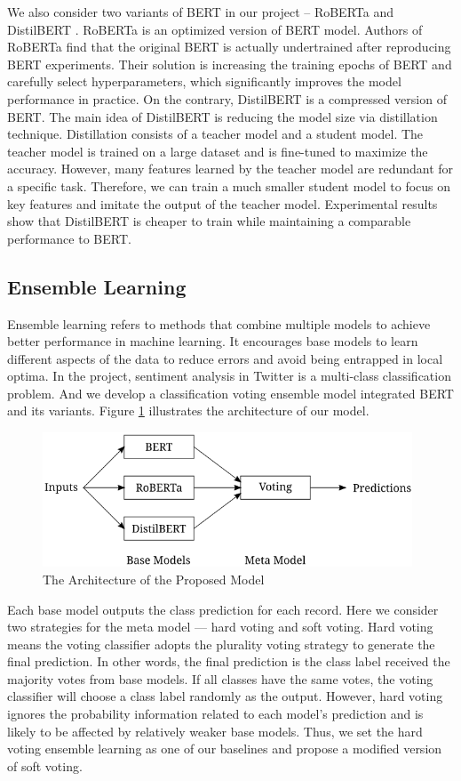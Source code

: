 \documentclass[runningheads]{llncs}
\begin{document}
We also consider two variants of BERT in our project -- RoBERTa \cite{roberta} and DistilBERT \cite{distilbert}. RoBERTa is an optimized version of BERT model. Authors of RoBERTa find that the original BERT is actually undertrained after reproducing BERT experiments. Their solution is increasing the training epochs of BERT and carefully select hyperparameters, which significantly improves the model performance in practice. On the contrary, DistilBERT is a compressed version of BERT. The main idea of DistilBERT is reducing the model size via distillation technique. Distillation consists of a teacher model and a student model. The teacher model is trained on a large dataset and is fine-tuned to maximize the accuracy. However, many features learned by the teacher model are redundant for a specific task. Therefore, we can train a much smaller student model to focus on key features and imitate the output of the teacher model. Experimental results show that DistilBERT is cheaper to train while maintaining a comparable performance to BERT.

\subsection{Ensemble Learning}
Ensemble learning refers to methods that combine multiple models to achieve better performance in machine learning. It encourages base models to learn different aspects of the data to reduce errors and avoid being entrapped in local optima. In the project, sentiment analysis in Twitter is a multi-class classification problem. And we develop a classification voting ensemble model integrated BERT and its variants. Figure \ref{fig:model} illustrates the architecture of our model.

\begin{figure}[!ht]
    \centering
    \includegraphics[width=11cm]{./figs/model.png}
    \caption{The Architecture of the Proposed Model}
    \label{fig:model}
\end{figure}

Each base model outputs the class prediction for each record. Here we consider two strategies for the meta model --- hard voting and soft voting. Hard voting means the voting classifier adopts the plurality voting strategy to generate the final prediction. In other words, the final prediction is the class label received the majority votes from base models. If all classes have the same votes, the voting classifier will choose a class label randomly as the output. However, hard voting ignores the probability information related to each model's prediction and is likely to be affected by relatively weaker base models. Thus, we set the hard voting ensemble learning as one of our baselines and propose a modified version of soft voting.
\end{document}
